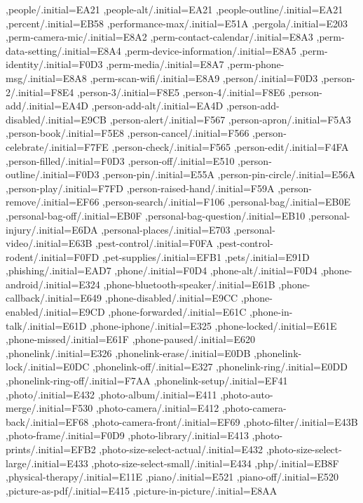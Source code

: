 { ,people/.initial=EA21
 ,people-alt/.initial=EA21
 ,people-outline/.initial=EA21
 ,percent/.initial=EB58
 ,performance-max/.initial=E51A
 ,pergola/.initial=E203
 ,perm-camera-mic/.initial=E8A2
 ,perm-contact-calendar/.initial=E8A3
 ,perm-data-setting/.initial=E8A4
 ,perm-device-information/.initial=E8A5
 ,perm-identity/.initial=F0D3
 ,perm-media/.initial=E8A7
 ,perm-phone-msg/.initial=E8A8
 ,perm-scan-wifi/.initial=E8A9
 ,person/.initial=F0D3
 ,person-2/.initial=F8E4
 ,person-3/.initial=F8E5
 ,person-4/.initial=F8E6
 ,person-add/.initial=EA4D
 ,person-add-alt/.initial=EA4D
 ,person-add-disabled/.initial=E9CB
 ,person-alert/.initial=F567
 ,person-apron/.initial=F5A3
 ,person-book/.initial=F5E8
 ,person-cancel/.initial=F566
 ,person-celebrate/.initial=F7FE
 ,person-check/.initial=F565
 ,person-edit/.initial=F4FA
 ,person-filled/.initial=F0D3
 ,person-off/.initial=E510
 ,person-outline/.initial=F0D3
 ,person-pin/.initial=E55A
 ,person-pin-circle/.initial=E56A
 ,person-play/.initial=F7FD
 ,person-raised-hand/.initial=F59A
 ,person-remove/.initial=EF66
 ,person-search/.initial=F106
 ,personal-bag/.initial=EB0E
 ,personal-bag-off/.initial=EB0F
 ,personal-bag-question/.initial=EB10
 ,personal-injury/.initial=E6DA
 ,personal-places/.initial=E703
 ,personal-video/.initial=E63B
 ,pest-control/.initial=F0FA
 ,pest-control-rodent/.initial=F0FD
 ,pet-supplies/.initial=EFB1
 ,pets/.initial=E91D
 ,phishing/.initial=EAD7
 ,phone/.initial=F0D4
 ,phone-alt/.initial=F0D4
 ,phone-android/.initial=E324
 ,phone-bluetooth-speaker/.initial=E61B
 ,phone-callback/.initial=E649
 ,phone-disabled/.initial=E9CC
 ,phone-enabled/.initial=E9CD
 ,phone-forwarded/.initial=E61C
 ,phone-in-talk/.initial=E61D
 ,phone-iphone/.initial=E325
 ,phone-locked/.initial=E61E
 ,phone-missed/.initial=E61F
 ,phone-paused/.initial=E620
 ,phonelink/.initial=E326
 ,phonelink-erase/.initial=E0DB
 ,phonelink-lock/.initial=E0DC
 ,phonelink-off/.initial=E327
 ,phonelink-ring/.initial=E0DD
 ,phonelink-ring-off/.initial=F7AA
 ,phonelink-setup/.initial=EF41
 ,photo/.initial=E432
 ,photo-album/.initial=E411
 ,photo-auto-merge/.initial=F530
 ,photo-camera/.initial=E412
 ,photo-camera-back/.initial=EF68
 ,photo-camera-front/.initial=EF69
 ,photo-filter/.initial=E43B
 ,photo-frame/.initial=F0D9
 ,photo-library/.initial=E413
 ,photo-prints/.initial=EFB2
 ,photo-size-select-actual/.initial=E432
 ,photo-size-select-large/.initial=E433
 ,photo-size-select-small/.initial=E434
 ,php/.initial=EB8F
 ,physical-therapy/.initial=E11E
 ,piano/.initial=E521
 ,piano-off/.initial=E520
 ,picture-as-pdf/.initial=E415
 ,picture-in-picture/.initial=E8AA
}

